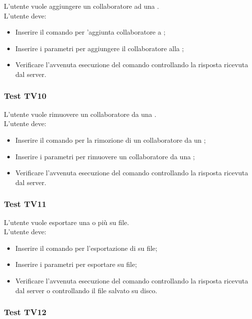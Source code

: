 \documentclass{scalatekids-article}
\begin{document}
L'utente vuole aggiungere un collaboratore ad una .\\
L'utente deve:
\begin{itemize}
\item Inserire il comando per 'aggiunta collaboratore a ;
\item Inserire i parametri per aggiungere il collaboratore alla  ;
\item Verificare l'avvenuta esecuzione del comando controllando la risposta ricevuta dal server.
\end{itemize}


\subsubsection{Test TV10}

L'utente vuole rimuovere un collaboratore da una .\\
L'utente deve:
\begin{itemize}
\item Inserire il comando per la rimozione di un collaboratore da un ;
\item Inserire i parametri per rimuovere un collaboratore da una ;
\item Verificare l'avvenuta esecuzione del comando controllando la risposta ricevuta dal server.
\end{itemize}

\subsubsection{Test TV11}

L'utente vuole esportare una o più  su file.\\
L'utente deve:
\begin{itemize}
\item Inserire il comando per l'esportazione di  su file;
\item Inserire i parametri per esportare  su file;
\item Verificare l'avvenuta esecuzione del comando controllando la risposta ricevuta dal server o controllando il file salvato su disco.
\end{itemize}

\subsubsection{Test TV12}
\end{document}
